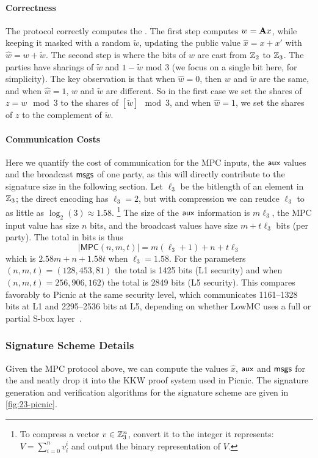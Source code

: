 \paragraph{Correctness} The protocol correctly computes the \ttOWF.  The
first step computes $w = \mathbf{A} x$, while keeping it masked with a random $\tilde{w}$,
updating the public value $\hat{x} = x + x'$ with $\hat{w} = w + \tilde{w}$.  The
second step is where the bits of $w$ are cast from $\mathbb{Z}_2$ to $\mathbb{Z}_3$.  The 
parties have sharings of $\tilde{w}$ and $1-\tilde{w}$ mod 3 (we focus on a single bit here, for simplicity). The key observation is
that when $\hat{w} = 0$, then $w$ and $\tilde{w}$ are the same, and when $\hat{w} =
1$, $w$ and $\tilde{w}$ are different. So in the first case we set the shares of $ z =
w \mod 3$ to the shares of $[\tilde{w}] \mod 3$, and when $\hat{w} = 1$, we set the
shares of $z$ to the complement of $\tilde{w}$.

\paragraph{Communication Costs}
Here we quantify the cost of communication for the MPC inputs, the $\textsf{aux}$ values and the broadcast $\textsf{msgs}$ of one party,
as this will directly contribute to the signature size in the following section. 
Let $\ell_3$ be the bitlength of an element in $\mathbb{Z}_3$; the direct encoding has
$\ell_3 = 2$, but with compression we can reudce $\ell_3$ to as little as
$\log_2(3) \approx 1.58$. \footnote{To compress a vector $v\in\mathbb{Z}_3^{n}$, convert it to the integer it represents: $V = \sum_{i=0}^n v_i^{i}$
and output the binary representation of $V$.  }   The size of the
$\textsf{aux}$ information is $m\ell_3$, the MPC input value has size $n$ bits, 
and the broadcast values have size $m + t\ell_3$ bits (per party). 
The total in bits is thus 
\begin{equation} \label{eqn:sizeMPC}
|\textsf{MPC}(n,m,t)| = m(\ell_3 + 1) + n + t\ell_3 
\end{equation}
which is $2.58m + n + 1.58t$ when $\ell_3 = 1.58$. 
For the parameters 
$(n,m,t)=(128, 453, 81)$ the total is 1425 bits (L1 security)
and when $(n,m,t) = 256, 906, 162)$ the total is 2849 bits (L5 security).  This compares favorably to
Picnic at the same security level, which communicates 1161--1328 bits at L1
and 2295--2536 bits at L5, depending on whether LowMC uses a full or partial S-box layer~\cite{TCHES:KalZav20}.

\subsubsection{Signature Scheme Details}
Given the MPC protocol above, we can compute the values $\hat{x}$, $\textsf{aux}$ and
$\textsf{msgs}$ for the \ttOWF and neatly drop it into the KKW proof system used in
Picnic.  The signature generation and verification algorithms for the
\ttOWF  signature scheme are given in \cref{fig:23-picnic}.

